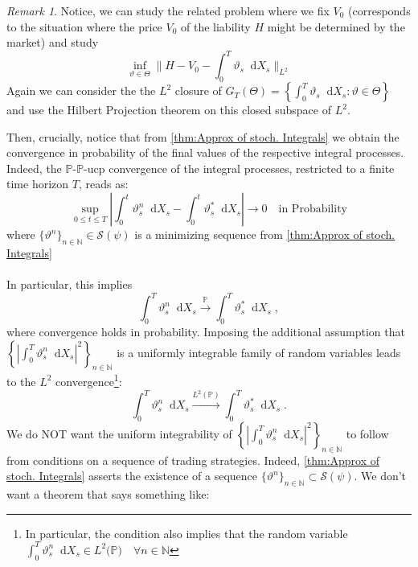 \documentclass[11pt]{report}
\newcommand{\diff}{\mathop{}\!\mathrm{d}}
\theoremstyle{plain} %
\theoremstyle{definition} %
\theoremstyle{remark} %
\newtheorem{remark}[remark]{Remark}
\begin{document}
\begin{remark}
    Notice, we can study the related problem where we fix \(V_0\) (corresponds to the situation where the price \(V_0\) of the liability \(H\) might be determined by the market) and study
    \begin{equation}
        \inf_{\vartheta\in\Theta}\lVert H-V_0-\int_{0}^T\vartheta_s\diff X_s\rVert_{L^2}
    \end{equation}
    Again we can consider the the \(L^2\) closure of \(G_T(\Theta)=\left\{\int_0^T \vartheta_s\diff X_s:\vartheta\in\Theta\right\}\) and use the Hilbert Projection theorem on this closed subspace of \(L^2\).
\end{remark}
Then, crucially, notice that from \cref{thm:Approx of stoch. Integrals} we obtain the convergence in probability of the final values of the respective integral processes. Indeed, the \(\mathbb{P}\)-\(\mathbb{P}\)-ucp convergence of the integral processes, restricted to a finite time horizon \(T\), reads as:
\begin{equation}
    \sup_{0\leq t\leq T}\left|\int_{0}^t\vartheta_s^n\diff X_s-\int_{0}^t\vartheta^*_s\diff X_s\right|\to 0\quad\text{in Probability}
\end{equation}
where \(\{\vartheta^n\}_{n\in\mathbb{N}}\in\mathcal{S}(\psi)\) is a minimizing sequence from \cref{thm:Approx of stoch. Integrals}
\\\\
In particular, this implies 
\begin{equation}
    \int_{0}^T\vartheta_s^n\diff X_s\xrightarrow{\mathbb{P}}\int_{0}^T\vartheta^*_s\diff X_s\;,
\end{equation}
where convergence holds in probability. Imposing the additional assumption that \(\left\{\left|\int_{0}^T\vartheta_s^n\diff X_s\right|^2\right\}_{n\in\mathbb{N}}\) is a uniformly integrable family of random variables  leads to the \(L^2\) convergence\footnote{In particular, the condition also implies that the random variable \(\int_{0}^T\vartheta_s^n\diff X_s\in L^2(\mathbb{P)}\quad\forall n\in\mathbb{N}\)}: 
\begin{equation}
\int_{0}^T\vartheta_s^n\diff X_s \xrightarrow{L^2(\mathbb{P})} \int_{0}^T\vartheta^*_s\diff X_s\;.
\end{equation}
We do NOT want the uniform integrability of \(\left\{\left|\int_{0}^T\vartheta_s^n\diff X_s\right|^2\right\}_{n\in\mathbb{N}}\) to follow from conditions on a sequence of trading strategies. Indeed, \cref{thm:Approx of stoch. Integrals} asserts the existence of a sequence \(\{\vartheta^n\}_{n\in\mathbb{N}}\subset\mathcal{S}(\psi)\). We don't want a theorem that says something like: 
\end{document}
